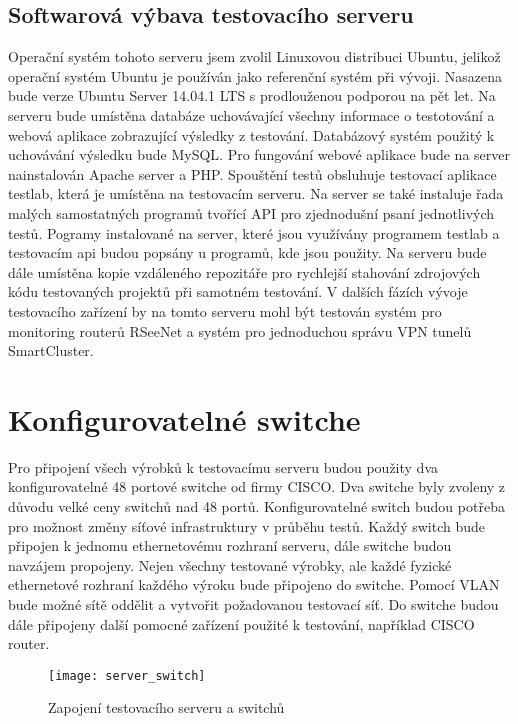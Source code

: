 \subsection{Softwarová výbava testovacího serveru}
Operační systém tohoto serveru jsem zvolil Linuxovou distribuci Ubuntu, jelikož operační systém Ubuntu je používán jako referenční systém při vývoji. Nasazena bude verze Ubuntu Server 14.04.1 LTS s prodlouženou podporou na pět let. Na serveru bude umístěna databáze uchovávající všechny informace o testotování a webová aplikace zobrazující výsledky z testování. Databázový systém použitý k uchovávání výsledku bude MySQL. Pro fungování webové aplikace bude na server nainstalován Apache server a PHP. Spouštění testů obsluhuje testovací aplikace testlab, která je umístěna na testovacím serveru. Na server se také instaluje řada malých samostatných programů tvořící API pro zjednodušní psaní jednotlivých testů. Pogramy instalované na server, které jsou využívány programem testlab a testovacím api budou popsány u programů, kde jsou použity. Na serveru bude dále umístěna kopie vzdáleného repozitáře pro rychlejší stahování zdrojových kódu testovaných projektů při samotném testování. V dalších fázích vývoje testovacího zařízení by na tomto serveru mohl být testován systém pro monitoring routerů RSeeNet a systém pro jednoduchou správu VPN tunelů SmartCluster.

\section{Konfigurovatelné switche}
Pro připojení všech výrobků k testovacímu serveru budou použity dva konfigurovatelné 48 portové switche od firmy CISCO. Dva switche byly zvoleny z důvodu velké ceny switchů nad 48 portů. Konfigurovatelné switch budou potřeba pro možnost změny síťové infrastruktury v průběhu testů. Každý switch bude připojen k jednomu ethernetovému rozhraní serveru, dále switche budou navzájem propojeny. Nejen všechny testované výrobky, ale každé fyzické ethernetové rozhraní každého výroku bude připojeno do switche. Pomocí VLAN bude možné sítě oddělit a vytvořit požadovanou testovací síť. Do switche budou dále připojeny další pomocné zařízení použité k testování, například CISCO router.

\begin{figure}[h]
  \centering
  \texttt{[image: server\_switch]}
  \caption{Zapojení testovacího serveru a switchů}
  \label{fig:server_switch}
\end{figure}

